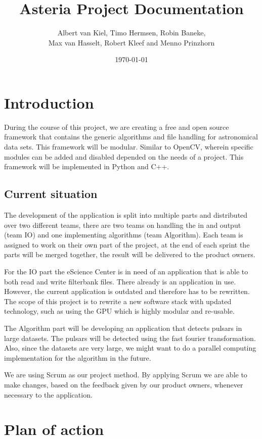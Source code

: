 \documentclass[a4paper,11pt]{report}
\title{Asteria Project Documentation}
\author{Albert van Kiel, Timo Hermsen, Robin Baneke,\\ Max van Hasselt, Robert Kleef and Menno Prinzhorn}
\date{\today}
\begin{document}
    
    \maketitle
    
    \chapter{Introduction}
	    
    During the course of this project, we are creating a free and open source framework that contains the generic algorithms and file handling for astronomical data sets. 
    This framework will be modular. Similar to OpenCV, wherein specific modules can be added and disabled depended on the needs of a project. 
    This framework will be implemented in Python and C++.
    
    \section{Current situation}
    
    The development of the application is split into multiple parts and distributed over two different teams, there are two teams on handling the in and output (team IO) and one implementing algorithms (team Algorithm). Each team is assigned to work on their own part of the 			    project, at the end of each sprint the parts will be merged together, the result will be delivered to the product owners.

    For the IO part the eScience Center is in need of an application that is able to both read and write filterbank files. There already is an application in use. 
    However, the current application is outdated and therefore has to be rewritten. The scope of this project is to rewrite a new software stack with updated technology, 
    such as using the GPU which is highly modular and re-usable.

	The Algorithm part will be developing an application that detects pulsars in large datasets. The pulsars will be detected using the fast fourier transformation. Also, since the datasets are very large, we might want to do a parallel computing implementation for the algorithm in the          	future.

    We are using Scrum as our project method. By applying Scrum we are able to make changes, based on the feedback given by our product owners, whenever necessary to the application.
    
    \chapter{Plan of action}
    
\end{document}

